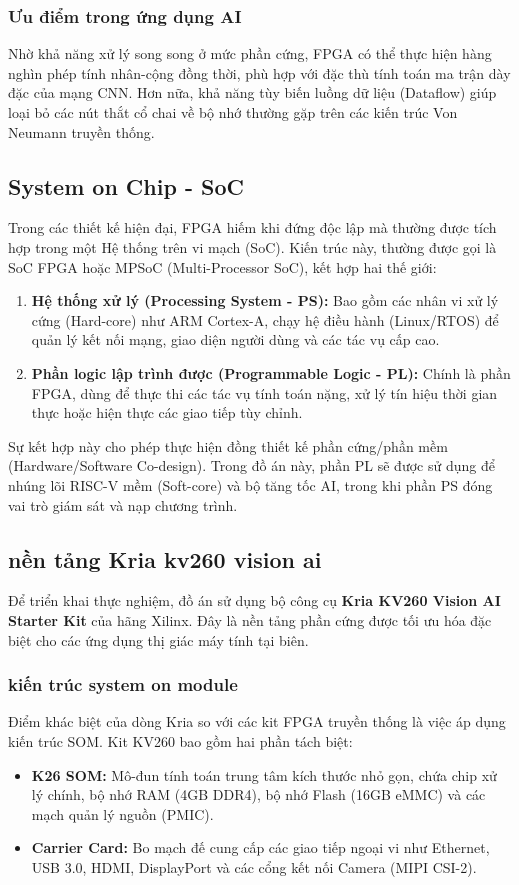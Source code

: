 \subsubsection{Ưu điểm trong ứng dụng AI}
Nhờ khả năng xử lý song song ở mức phần cứng, FPGA có thể thực hiện hàng nghìn phép tính nhân-cộng đồng thời, phù hợp với đặc thù tính toán ma trận dày đặc của mạng CNN. Hơn nữa, khả năng tùy biến luồng dữ liệu (Dataflow) giúp loại bỏ các nút thắt cổ chai về bộ nhớ thường gặp trên các kiến trúc Von Neumann truyền thống.

\subsection{System on Chip - SoC}
Trong các thiết kế hiện đại, FPGA hiếm khi đứng độc lập mà thường được tích hợp trong một Hệ thống trên vi mạch (SoC). Kiến trúc này, thường được gọi là SoC FPGA hoặc MPSoC (Multi-Processor SoC), kết hợp hai thế giới:

\begin{enumerate}
    \item \textbf{Hệ thống xử lý (Processing System - PS):} Bao gồm các nhân vi xử lý cứng (Hard-core) như ARM Cortex-A, chạy hệ điều hành (Linux/RTOS) để quản lý kết nối mạng, giao diện người dùng và các tác vụ cấp cao.
    \item \textbf{Phần logic lập trình được (Programmable Logic - PL):} Chính là phần FPGA, dùng để thực thi các tác vụ tính toán nặng, xử lý tín hiệu thời gian thực hoặc hiện thực các giao tiếp tùy chỉnh.
\end{enumerate}

Sự kết hợp này cho phép thực hiện đồng thiết kế phần cứng/phần mềm (Hardware/Software Co-design). Trong đồ án này, phần PL sẽ được sử dụng để nhúng lõi RISC-V mềm (Soft-core) và bộ tăng tốc AI, trong khi phần PS đóng vai trò giám sát và nạp chương trình.

\subsection{nền tảng Kria kv260 vision ai}
Để triển khai thực nghiệm, đồ án sử dụng bộ công cụ \textbf{Kria KV260 Vision AI Starter Kit} của hãng Xilinx. Đây là nền tảng phần cứng được tối ưu hóa đặc biệt cho các ứng dụng thị giác máy tính tại biên.

\subsubsection{kiến trúc system on module}
Điểm khác biệt của dòng Kria so với các kit FPGA truyền thống là việc áp dụng kiến trúc SOM. Kit KV260 bao gồm hai phần tách biệt:
\begin{itemize}
    \item \textbf{K26 SOM:} Mô-đun tính toán trung tâm kích thước nhỏ gọn, chứa chip xử lý chính, bộ nhớ RAM (4GB DDR4), bộ nhớ Flash (16GB eMMC) và các mạch quản lý nguồn (PMIC).
    \item \textbf{Carrier Card:} Bo mạch đế cung cấp các giao tiếp ngoại vi như Ethernet, USB 3.0, HDMI, DisplayPort và các cổng kết nối Camera (MIPI CSI-2).
\end{itemize}

